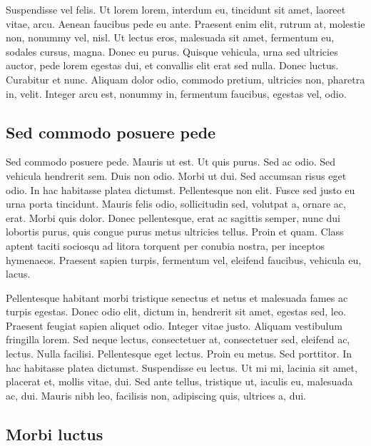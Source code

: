   Suspendisse vel felis. Ut lorem lorem, interdum eu, tincidunt sit
  amet, laoreet vitae, arcu. Aenean faucibus pede eu ante. Praesent enim
  elit, rutrum at, molestie non, nonummy vel, nisl. Ut lectus eros,
  malesuada sit amet, fermentum eu, sodales cursus, magna. Donec eu
  purus. Quisque vehicula, urna sed ultricies auctor, pede lorem egestas
  dui, et convallis elit erat sed nulla. Donec luctus. Curabitur et
  nunc. Aliquam dolor odio, commodo pretium, ultricies non, pharetra in,
  velit. Integer arcu est, nonummy in, fermentum faucibus, egestas vel,
  odio.

  \subsection{Sed commodo posuere pede}

  Sed commodo posuere pede. Mauris ut est. Ut quis purus. Sed ac odio.
  Sed vehicula hendrerit sem. Duis non odio. Morbi ut dui. Sed accumsan
  risus eget odio. In hac habitasse platea dictumst. Pellentesque non
  elit.  Fusce sed justo eu urna porta tincidunt. Mauris felis odio,
  sollicitudin sed, volutpat a, ornare ac, erat. Morbi quis dolor. Donec
  pellentesque, erat ac sagittis semper, nunc dui lobortis purus, quis
  congue purus metus ultricies tellus. Proin et quam. Class aptent
  taciti sociosqu ad litora torquent per conubia nostra, per inceptos
  hymenaeos. Praesent sapien turpis, fermentum vel, eleifend faucibus,
  vehicula eu, lacus.

  Pellentesque habitant morbi tristique senectus et netus et malesuada
  fames ac turpis egestas. Donec odio elit, dictum in, hendrerit sit
  amet, egestas sed, leo. Praesent feugiat sapien aliquet odio. Integer
  vitae justo.  Aliquam vestibulum fringilla lorem. Sed neque lectus,
  consectetuer at, consectetuer sed, eleifend ac, lectus. Nulla
  facilisi. Pellentesque eget lectus. Proin eu metus. Sed porttitor. In
  hac habitasse platea dictumst. Suspendisse eu lectus. Ut mi mi,
  lacinia sit amet, placerat et, mollis vitae, dui. Sed ante tellus,
  tristique ut, iaculis eu, malesuada ac, dui. Mauris nibh leo,
  facilisis non, adipiscing quis, ultrices a, dui.

  \subsection{Morbi luctus}

